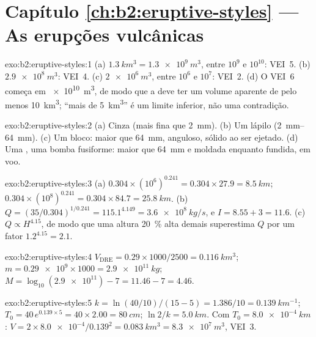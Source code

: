 \section*{Capítulo \ref{ch:b2:eruptive-styles} --- As erupções vulcânicas}

\begin{solution}{exo:b2:eruptive-styles:1}
(a) $\qty{1.3}{km^3} = \qty{1.3e9}{m^3}$, entre $10^9$ e $10^{10}$: VEI~5.
(b) $\qty{2.9e8}{m^3}$: VEI~4. (c) $\qty{2e6}{m^3}$, entre $10^6$ e $10^7$:
VEI~2. (d) O VEI~6 começa em \qty{e10}{m^3}, de modo que a  deve ter um volume aparente de pelo menos
\qty{10}{km^3}; ``mais de \qty{5}{km^3}'' é um limite inferior, não uma contradição.
\end{solution}

\begin{solution}{exo:b2:eruptive-styles:2}
(a) Cinza (mais fina que \qty{2}{mm}). (b) Um lápilo (\qtyrange{2}{64}{mm}).
(c) Um bloco: maior que \qty{64}{mm}, anguloso, sólido ao ser ejetado. (d) Uma
, uma bomba fusiforme: maior que \qty{64}{mm} e moldada enquanto fundida,
em voo.
\end{solution}

\begin{solution}{exo:b2:eruptive-styles:3}
(a) $0.304\times(10^6)^{0.241} = 0.304\times27.9 = \qty{8.5}{km}$;
$0.304\times(10^8)^{0.241} = 0.304\times84.7 = \qty{25.8}{km}$.
(b) $Q = (35/0.304)^{1/0.241} = 115.1^{4.149} = \qty{3.6e8}{kg/s}$, e $I =
8.55 + 3 = 11.6$. (c) $Q \propto H^{4.15}$, de modo que uma altura \qty{20}{\percent} alta demais
superestima $Q$ por um fator $1.2^{4.15} = 2.1$.
\end{solution}

\begin{solution}{exo:b2:eruptive-styles:4}
$V_{\mathrm{DRE}} = 0.29\times1000/2500 = \qty{0.116}{km^3}$; $m =
\num{0.29e9}\times1000 = \qty{2.9e11}{kg}$; $M = \log_{10}(\num{2.9e11}) - 7 = 11.46
- 7 = 4.46$.
\end{solution}

\begin{solution}{exo:b2:eruptive-styles:5}
$k = \ln(40/10)/(15 - 5) = 1.386/10 = \qty{0.139}{km^{-1}}$; $T_0 = 40\,e^{0.139\times5}
= 40\times2.00 = \qty{80}{cm}$; $\ln2/k = \qty{5.0}{km}$. Com $T_0 =
\qty{8.0e-4}{km}$: $V = 2\times\num{8.0e-4}/0.139^2 = \qty{0.083}{km^3} =
\qty{8.3e7}{m^3}$, VEI~3.
\end{solution}

